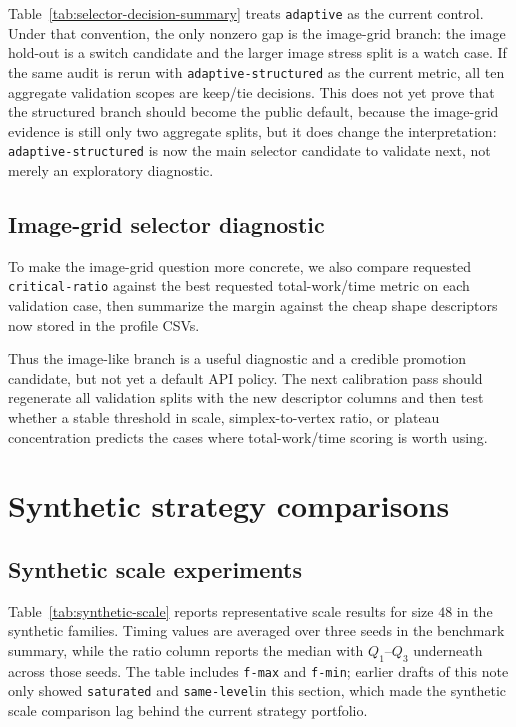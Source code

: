 \documentclass[11pt]{article}
\newcommand{\slred}{\texttt{same-level}}
\begin{document}


Table~\ref{tab:selector-decision-summary} treats \texttt{adaptive} as the current control.
Under that convention, the only nonzero gap is the image-grid branch: the image hold-out is
a switch candidate and the larger image stress split is a watch case.  If the same audit is
rerun with \texttt{adaptive-structured} as the current metric, all ten aggregate validation
scopes are keep/tie decisions.  This does not yet prove that the structured branch should
become the public default, because the image-grid evidence is still only two aggregate
splits, but it does change the interpretation: \texttt{adaptive-structured} is now the main
selector candidate to validate next, not merely an exploratory diagnostic.

\subsection{Image-grid selector diagnostic}

To make the image-grid question more concrete, we also compare requested
\texttt{critical-ratio} against the best requested total-work/time metric on each
validation case, then summarize the margin against the cheap shape descriptors now stored
in the profile CSVs.





Thus the image-like branch is a useful diagnostic and a credible promotion candidate, but
not yet a default API policy.  The next calibration pass should regenerate all validation
splits with the new descriptor columns and then test whether a stable threshold in scale,
simplex-to-vertex ratio, or plateau concentration predicts the cases where
total-work/time scoring is worth using.

\section{Synthetic strategy comparisons}

\subsection{Synthetic scale experiments}

Table~\ref{tab:synthetic-scale} reports representative scale results for size $48$ in
the synthetic families.  Timing values are averaged over three seeds in the benchmark
summary, while the ratio column reports the median with $Q_1$--$Q_3$ underneath across
those seeds.
The table includes \texttt{f-max} and \texttt{f-min}; earlier drafts of this note only
showed \texttt{saturated} and \slred in this section, which made the synthetic scale
comparison lag behind the current strategy portfolio.
\end{document}
